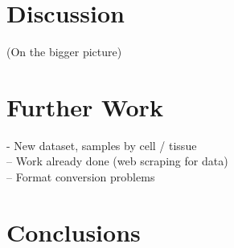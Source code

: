 \documentclass[12pt,a4paper]{article}
\begin{document}
\section{Discussion}
\label{sec:discussion}
(On the bigger picture)\\

\section{Further Work}
\label{sec:further_work}

- New dataset, samples by cell / tissue\\
-- Work already done (web scraping for data)\\
-- Format conversion problems\\


\section{Conclusions}
\label{sec:conclusions}

\newpage
\appendix
\end{document}
